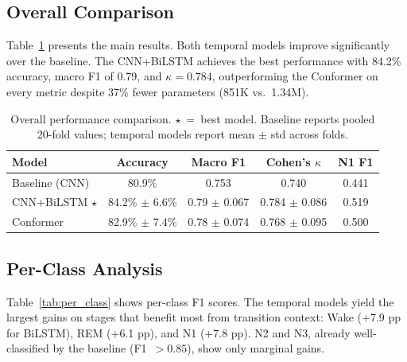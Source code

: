 \documentclass[final]{article}
\begin{document}
\subsection{Overall Comparison}

Table~\ref{tab:main_results} presents the main results. Both temporal models improve significantly over the baseline. The CNN+BiLSTM achieves the best performance with 84.2\% accuracy, macro F1 of 0.79, and $\kappa = 0.784$, outperforming the Conformer on every metric despite 37\% fewer parameters (851K vs.\ 1.34M).

\begin{table}[t]
\caption{Overall performance comparison. $\star$~=~best model. Baseline reports pooled 20-fold values; temporal models report mean $\pm$ std across folds.}
\label{tab:main_results}
\centering
\small
\begin{tabular}{lcccc}
\toprule
\textbf{Model} & \textbf{Accuracy} & \textbf{Macro F1} & \textbf{Cohen's $\kappa$} & \textbf{N1 F1} \\
\midrule
Baseline (CNN)           & 80.9\%                  & 0.753              & 0.740               & 0.441 \\
CNN+BiLSTM $\star$       & 84.2\% $\pm$ 6.6\%     & 0.79 $\pm$ 0.067   & 0.784 $\pm$ 0.086   & 0.519 \\
Conformer            & 82.9\% $\pm$ 7.4\%     & 0.78 $\pm$ 0.074   & 0.768 $\pm$ 0.095   & 0.500 \\
\bottomrule
\end{tabular}
\end{table}

\subsection{Per-Class Analysis}

Table~\ref{tab:per_class} shows per-class F1 scores. The temporal models yield the largest gains on stages that benefit most from transition context: Wake (+7.9 pp for BiLSTM), REM (+6.1 pp), and N1 (+7.8 pp). N2 and N3, already well-classified by the baseline (F1~$> 0.85$), show only marginal gains.
\end{document}
